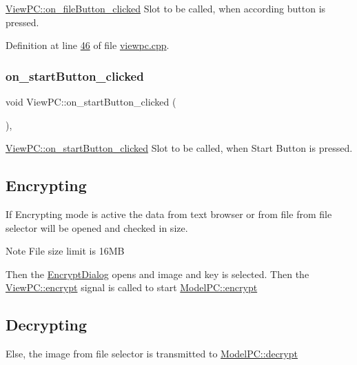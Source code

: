 \mbox{\hyperlink{class_view_p_c_a3b9b7a7be9702d8b160f257f1c74a776}{View\+P\+C\+::on\+\_\+file\+Button\+\_\+clicked}} Slot to be called, when according button is pressed. 



Definition at line \mbox{\hyperlink{viewpc_8cpp_source_l00046}{46}} of file \mbox{\hyperlink{viewpc_8cpp_source}{viewpc.\+cpp}}.

\mbox{\label{class_view_p_c_a456d75b7c5d3a089302a576e7359f1f4}} 
\subsubsection{\texorpdfstring{on\+\_\+start\+Button\+\_\+clicked}{on\_startButton\_clicked}}
{\footnotesize\ttfamily void View\+P\+C\+::on\+\_\+start\+Button\+\_\+clicked (\begin{DoxyParamCaption}{ }\end{DoxyParamCaption})\hspace{0.3cm}{\ttfamily [protected]}, {\ttfamily [slot]}}



\mbox{\hyperlink{class_view_p_c_a456d75b7c5d3a089302a576e7359f1f4}{View\+P\+C\+::on\+\_\+start\+Button\+\_\+clicked}} Slot to be called, when Start Button is pressed. 

\hypertarget{class_view_p_c_encrypting}{}\subsection{Encrypting}\label{class_view_p_c_encrypting}
If Encrypting mode is active the data from text browser or from file from file selector will be opened and checked in size. \begin{DoxyNote}{Note}
File size limit is 16\+MB
\end{DoxyNote}
Then the \mbox{\hyperlink{class_encrypt_dialog}{Encrypt\+Dialog}} opens and image and key is selected. Then the \mbox{\hyperlink{class_view_p_c_ade35449b95cf1c5424c4eb929f46fd73}{View\+P\+C\+::encrypt}} signal is called to start \mbox{\hyperlink{class_model_p_c_a8ef76567bc0c0307b4e2547c46536e51}{Model\+P\+C\+::encrypt}} \hypertarget{class_view_p_c_decrypting}{}\subsection{Decrypting}\label{class_view_p_c_decrypting}
Else, the image from file selector is transmitted to \mbox{\hyperlink{class_model_p_c_af1f0b21565bf39808c4cdd448fad0ea8}{Model\+P\+C\+::decrypt}} 

